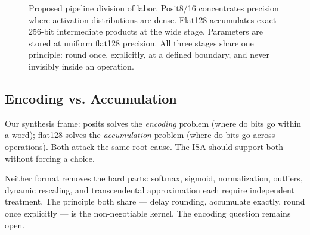 \documentclass[runningheads]{llncs}
\begin{document}
\begin{figure}[h]
\centering
{}
\caption{Proposed pipeline division of labor. Posit8/16 concentrates
precision where activation distributions are dense. Flat128 accumulates
exact 256-bit intermediate products at the wide stage. Parameters are
stored at uniform flat128 precision. All three stages share one
principle: round once, explicitly, at a defined boundary, and never
invisibly inside an operation.}
\label{fig:pipeline}
\end{figure}
\subsection{Encoding vs. Accumulation}
Our synthesis frame: posits solves the \emph{encoding} problem (where do
bits go within a word); flat128 solves the \emph{accumulation} problem
(where do bits go across operations). Both attack the same root cause.
The ISA should support both without forcing a choice.

Neither format removes the hard parts: softmax, sigmoid, normalization,
outliers, dynamic rescaling, and transcendental approximation each
require independent treatment. The principle both share --- delay
rounding, accumulate exactly, round once explicitly --- is the
non-negotiable kernel. The encoding question remains open.
\end{document}

